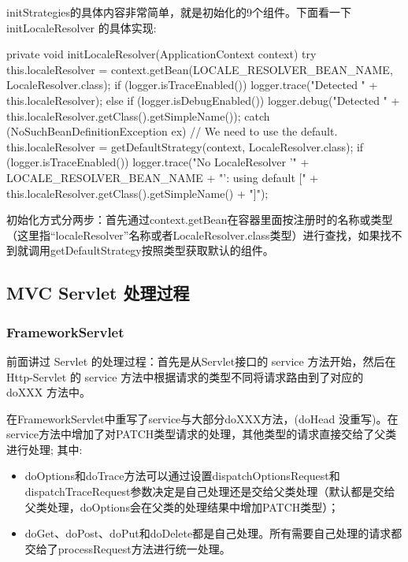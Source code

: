 initStrategies的具体内容非常简单，就是初始化的9个组件。下面看一下 initLocaleResolver 的具体实现:

\begin{Java}
private void initLocaleResolver(ApplicationContext context) {
	try {
		this.localeResolver = context.getBean(LOCALE_RESOLVER_BEAN_NAME, LocaleResolver.class);
		if (logger.isTraceEnabled()) {
			logger.trace("Detected " + this.localeResolver);
		}
		else if (logger.isDebugEnabled()) {
			logger.debug("Detected " + this.localeResolver.getClass().getSimpleName());
		}
	}
	catch (NoSuchBeanDefinitionException ex) {
		// We need to use the default.
		this.localeResolver = getDefaultStrategy(context, LocaleResolver.class);
		if (logger.isTraceEnabled()) {
			logger.trace("No LocaleResolver '" + LOCALE_RESOLVER_BEAN_NAME +
					"': using default [" + this.localeResolver.getClass().getSimpleName() + "]");
		}
	}
}
\end{Java}

初始化方式分两步：首先通过context.getBean在容器里面按注册时的名称或类型（这里指“localeResolver”名称或者LocaleResolver.class类型）进行查找，如果找不到就调用getDefaultStrategy按照类型获取默认的组件。

\subsection{MVC Servlet 处理过程}

\subsubsection{FrameworkServlet}

前面讲过 Servlet 的处理过程：首先是从Servlet接口的 service 方法开始，然后在 Http-Servlet 的 service 方法中根据请求的类型不同将请求路由到了对应的 doXXX 方法中。

在FrameworkServlet中重写了service与大部分doXXX方法，(doHead 没重写)。在service方法中增加了对PATCH类型请求的处理，其他类型的请求直接交给了父类进行处理; 其中:
\begin{itemize}
    \item doOptions和doTrace方法可以通过设置dispatchOptionsRequest和dispatchTraceRequest参数决定是自己处理还是交给父类处理（默认都是交给父类处理，doOptions会在父类的处理结果中增加PATCH类型）；
    \item doGet、doPost、doPut和doDelete都是自己处理。所有需要自己处理的请求都交给了processRequest方法进行统一处理。
\end{itemize}

